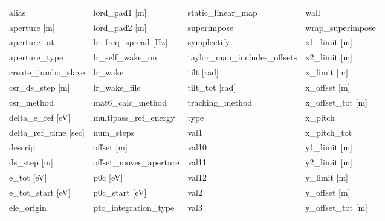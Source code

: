  \begin{tabular}{llll} \toprule
alias                            & lord_pad1 [m]                    & static_linear_map                & wall                             \\
aperture [m]                     & lord_pad2 [m]                    & superimpose                      & wrap_superimpose                 \\
aperture_at                      & lr_freq_spread [Hz]              & symplectify                      & x1_limit [m]                     \\
aperture_type                    & lr_self_wake_on                  & taylor_map_includes_offsets      & x2_limit [m]                     \\
create_jumbo_slave               & lr_wake                          & tilt [rad]                       & x_limit [m]                      \\
csr_ds_step [m]                  & lr_wake_file                     & tilt_tot [rad]                   & x_offset [m]                     \\
csr_method                       & mat6_calc_method                 & tracking_method                  & x_offset_tot [m]                 \\
delta_e_ref [eV]                 & multipass_ref_energy             & type                             & x_pitch                          \\
delta_ref_time [sec]             & num_steps                        & val1                             & x_pitch_tot                      \\
descrip                          & offset [m]                       & val10                            & y1_limit [m]                     \\
ds_step [m]                      & offset_moves_aperture            & val11                            & y2_limit [m]                     \\
e_tot [eV]                       & p0c [eV]                         & val12                            & y_limit [m]                      \\
e_tot_start [eV]                 & p0c_start [eV]                   & val2                             & y_offset [m]                     \\
ele_origin                       & ptc_integration_type             & val3                             & y_offset_tot [m]                 \\

\end{tabular}
